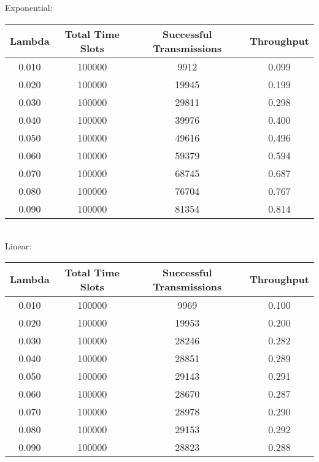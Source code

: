 \documentclass{article}
\begin{document}
\section{}

\part{}	
	
\section{}
Exponential: \\
\begin{tabular}{c | c | c | c}
	Lambda    & Total Time Slots & Successful Transmissions & Throughput \\
	\hline
	0.010     & 100000    & 9912      & 0.099     \\
	0.020     & 100000    & 19945     & 0.199     \\
	0.030     & 100000    & 29811     & 0.298     \\
	0.040     & 100000    & 39976     & 0.400     \\
	0.050     & 100000    & 49616     & 0.496     \\
	0.060     & 100000    & 59379     & 0.594     \\
	0.070     & 100000    & 68745     & 0.687     \\
	0.080     & 100000    & 76704     & 0.767     \\
	0.090     & 100000    & 81354     & 0.814     \\
\end{tabular} \\

\noindent Linear: \\
\begin{tabular}{c | c | c | c}
	Lambda    & Total Time Slots & Successful Transmissions & Throughput \\
	\hline
	0.010     & 100000    & 9969      & 0.100     \\
	0.020     & 100000    & 19953     & 0.200     \\
	0.030     & 100000    & 28246     & 0.282     \\
	0.040     & 100000    & 28851     & 0.289     \\
	0.050     & 100000    & 29143     & 0.291     \\
	0.060     & 100000    & 28670     & 0.287     \\
	0.070     & 100000    & 28978     & 0.290     \\
	0.080     & 100000    & 29153     & 0.292     \\
	0.090     & 100000    & 28823     & 0.288     \\
\end{tabular} \\


\section{}
\end{document}
